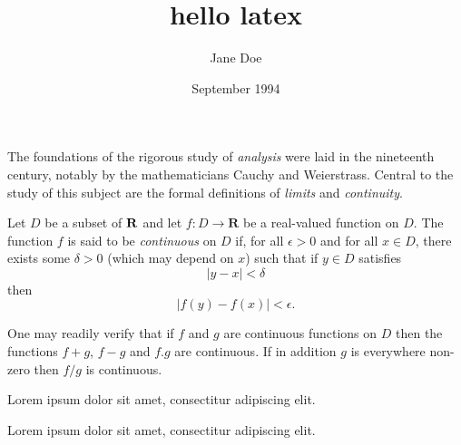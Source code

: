\documentclass[a4paper,12pt]{article}
\title{hello latex}
\author{Jane Doe}
\date{September 1994}
\begin{document}
	\maketitle

The foundations of the rigorous study of \emph{analysis}
were laid in the nineteenth century, notably by the
mathematicians Cauchy and Weierstrass. Central to the
study of this subject are the formal definitions of
\emph{limits} and \emph{continuity}.

Let $D$ be a subset of $\bf R$ and let
$f \colon D \to \mathbf{R}$ be a real-valued function on
$D$. The function $f$ is said to be \emph{continuous} on
$D$ if, for all $\epsilon > 0$ and for all $x \in D$,
there exists some $\delta > 0$ (which may depend on $x$)
such that if $y \in D$ satisfies
\[ |y - x| < \delta \]
then
\[ |f(y) - f(x)| < \epsilon. \]

One may readily verify that if $f$ and $g$ are continuous
functions on $D$ then the functions $f+g$, $f-g$ and
$f.g$ are continuous. If in addition $g$ is everywhere
non-zero then $f/g$ is continuous.

\renewcommand*\rmdefault{ppl}\normalfont\upshape
Lorem ipsum dolor sit amet, consectitur adipiscing elit.
 
\renewcommand*\rmdefault{ppl}\normalfont\upshape
Lorem ipsum dolor sit amet, consectitur adipiscing elit. %
 
\renewcommand*\rmdefault{iwona}\normalfont\upshape
\end{document}
